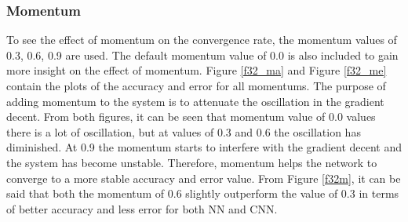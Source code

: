\documentclass[12pt]{article}
\begin{document}
\subsubsection*{Momentum}
To see the effect of momentum on the convergence rate, the momentum values of 0.3, 0.6, 0.9 are used. The default momentum value of 0.0 is also included to gain more insight on the effect of momentum. Figure \ref{f32_ma} and Figure \ref{f32_me} contain the plots of the accuracy and error for all momentums. The purpose of adding momentum to the system is to attenuate the oscillation in the gradient decent. From both figures, it can be seen that momentum value of 0.0 values there is a lot of oscillation, but at values of 0.3 and 0.6 the oscillation has diminished. At 0.9 the momentum starts to interfere with the gradient decent and the system has become unstable. Therefore, momentum helps the network to converge to a more stable accuracy and error value. From Figure \ref{f32m}, it can be said that both the momentum of 0.6 slightly outperform the value of 0.3 in terms of better accuracy and less error for both NN and CNN.  
\end{document}
